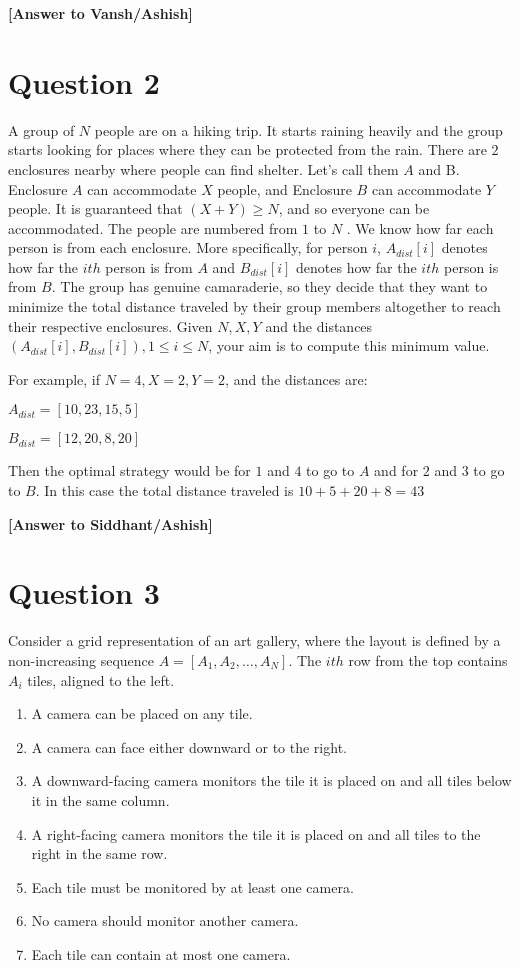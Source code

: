 \documentclass[a4paper,12pt]{article}
\begin{document}
\textbf{[Answer to Vansh/Ashish]}

\hrulefill

\section*{Question 2}

A group of $N$ people are on a hiking trip. It starts raining heavily and the group starts looking for places where they can be protected from the rain. There are $2$ enclosures nearby where people can find shelter. Let’s call them $A$ and B. Enclosure $A$ can accommodate $X$ people, and Enclosure $B$ can accommodate $Y$ people. It is guaranteed that $(X + Y) \ge N$, and so everyone can be accommodated. The people are numbered from $1$ to $N$ . We know how far each person is from each enclosure. More specifically, for person $i$, $A_{dist}[i]$ denotes how far the $ith$ person is from $A$ and $B_{dist}[i]$ denotes how far the $ith$ person is from $B$. The group has genuine camaraderie, so they decide that they want to minimize the total distance traveled by their group members altogether to reach their respective enclosures. Given $N , X, Y$ and the distances $(A_{dist}[i], B_{dist}[i]), 1 \le i \le N$, your aim is to compute this minimum value.

For example, if $N = 4, X = 2, Y = 2$, and the distances are:
\begin{center}
    $A_{dist} = [10, 23, 15, 5]$

    $B_{dist} = [12, 20, 8, 20]$
\end{center}
Then the optimal strategy would be for $1$ and $4$ to go to $A$ and for $2$ and $3$ to go to $B$. In this case the total distance traveled is $10 + 5 + 20 + 8 = 43$

\textbf{[Answer to Siddhant/Ashish]}

\hrulefill

\section*{Question 3}
 Consider a grid representation of an art gallery, where the layout is defined by a non-increasing sequence $A = [A_1, A_2, \dots, A_N]$. The $ith$ row from the top contains $A_i$ tiles, aligned to the left. 
 \begin{enumerate}[label=\roman*.]
    \item A camera can be placed on any tile.
    \item A camera can face either downward or to the right.
    \item A downward-facing camera monitors the tile it is placed on and all tiles below it in the same column.
    \item A right-facing camera monitors the tile it is placed on and all tiles to the right in the same row.
    \item Each tile must be monitored by at least one camera.
    \item No camera should monitor another camera.
    \item Each tile can contain at most one camera.
\end{enumerate}
\end{document}
